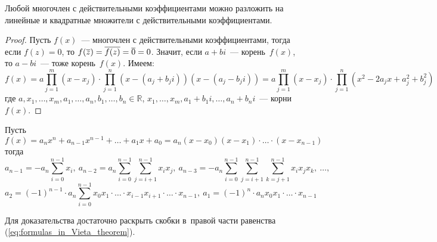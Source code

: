 \begin{theorem}
\label{th:polynomial_factorization}
Любой многочлен с действительными коэффициентами можно разложить на линейные и квадратные множители с действительными коэффициентами.
\end{theorem}
\begin{proof}
Пусть $f(x)$~--- многочлен с действительными коэффициентами, тогда если $f(z) = 0$, то $f(\overline z) \opbr= \overline{f(z)} \opbr= \overline 0 \opbr= 0$.
Значит, если $a + bi$~--- корень~$f(x)$, то $a - bi$~--- тоже корень~$f(x)$.
Имеем:
\begin{equation*}
f(x) = a \prod_{j=1}^{m} (x - x_j) \cdot \prod_{j=1}^{n} (x - (a_j + b_j i))(x - (a_j - b_j i)) =
a \prod_{j=1}^{m} (x - x_j) \cdot \prod_{j=1}^{n} (x^2 - 2a_j x + a_j^2 + b_j^2)
\end{equation*}
где $a, x_1, \ldots, x_m, a_1, \ldots, a_n, b_1, \ldots, b_n \in \mathbb R$,
$x_1, \ldots, x_m, a_1 + b_1 i, \ldots, a_n + b_n i$~--- корни~$f(x)$.
\end{proof}

\begin{theorem}
Пусть 
\begin{equation}
\label{eq:formulas_in_Vieta_theorem}
f(x) = a_n x^n + a_{n-1} x^{n-1} + \ldots + a_1 x + a_0 = a_n(x - x_0)(x - x_1) \cdot \ldots \cdot (x - x_{n-1})
\end{equation}
тогда
\begin{equation*}
a_{n-1} = -a_n \sum_{i=0}^{n-1} x_i, \
a_{n-2} = a_n \sum_{i=0}^{n-1} \sum_{j=i+1}^{n-1} x_i x_j, \
a_{n-3} = -a_n \sum_{i=0}^{n-1} \sum_{j=i+1}^{n-1} \sum_{k=j+1}^{n-1} x_i x_j x_k, \ \ldots,
\end{equation*}
\begin{equation*}
a_2 = (-1)^{n-1} \cdot a_n \sum_{i=0}^{n-1} x_0 x_1 \cdot \ldots \cdot x_{i-1} x_{i+1} \cdot \ldots \cdot x_{n-1}, \
a_1 = (-1)^n \cdot a_n x_0 x_1 \cdot \ldots \cdot x_{n-1}
\end{equation*}
\end{theorem}%
Для доказательства достаточно раскрыть скобки в~правой части равенства (\ref*{eq:formulas_in_Vieta_theorem}).


